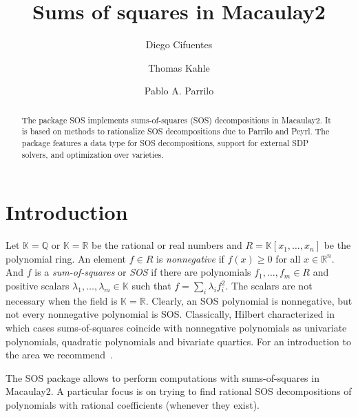 \documentclass[11pt]{amsart}
\theoremstyle{plain}%
\theoremstyle{definition}
\theoremstyle{remark}
\newcommand{\Mac}{Macaulay2\xspace}
\newcommand{\SOS}{\textsc{SOS}\xspace}
\newcommand{\QQ}{\mathbb{Q}}
\newcommand{\RR}{\mathbb{R}}
\newcommand{\kk}{\mathbb{K}}
\begin{document}
\title[Sums of squares in Macaulay2]{Sums of squares in Macaulay2}

\author{Diego Cifuentes}
\address{Massachusetts Institute of Technology \\ Cambridge, MA, USA}

\author{Thomas Kahle}
\address{Otto-von-Guericke University \\ Magdeburg, Germany}

\author{Pablo A. Parrilo}
\address{Massachusetts Institute of Technology \\ Cambridge, MA, USA}


\begin{abstract}
  The package \SOS implements sums-of-squares (SOS) decompositions in
  \Mac.
  It is based on methods to rationalize SOS decompositions due to Parrilo and Peyrl.
  The package features a data type for SOS decompositions, support for external SDP solvers, and optimization over varieties.
\end{abstract}

\maketitle

\section{Introduction}
\label{s:intro}

Let $\kk \!=\! \QQ$ or $\kk \!=\! \RR$ be the rational or real numbers and $R = \kk[x_{1},\dots,x_{n}]$ be the polynomial ring.
An element $f\!\in\! R$ is \emph{nonnegative} if $f(x) \!\ge\! 0$ for all $x \!\in\! \RR^{n}$.
And $f$ is a \emph{sum-of-squares} or \emph{SOS} if there are polynomials $f_{1},\dots,f_{m} \!\in\! R$ and positive scalars $\lambda_{1},\dots,\lambda_{m} \!\in\! \kk$ such that $f=\sum_{i}\lambda_i f_{i}^{2}$.
The scalars are not necessary when the field is $\kk\!=\!\RR$.
Clearly, an SOS polynomial is nonnegative, but not every nonnegative polynomial is SOS.
Classically, Hilbert characterized in which cases sums-of-squares coincide with nonnegative polynomials as univariate polynomials, quadratic polynomials and bivariate quartics.  
For an introduction to the area we recommend~\cite{scheiderer2009positivity,blekherman2012semidefinite}.

The \SOS package allows to perform computations with sums-of-squares in \Mac.
A particular focus is on trying to find rational SOS decompositions of polynomials with rational coefficients (whenever they exist).
\end{document}
